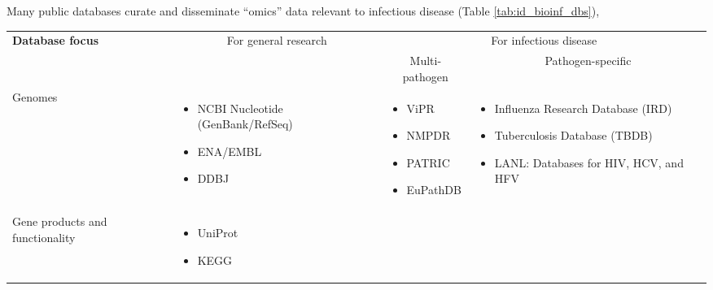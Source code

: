 Many public databases curate and disseminate “omics” data relevant to infectious disease (Table \ref{tab:id_bioinf_dbs}), 
\begin{table*}[ht]
  \centering
  \small
  \begin{tabular}{p{3.5cm} l l l}
    \toprule
    \textbf{Database focus} & \multicolumn{1}{c}{For general research} & \multicolumn{2}{c}{For infectious disease}\\
    \cline{3-4}
    & & \multicolumn{1}{c}{Multi-pathogen} & \multicolumn{1}{c}{Pathogen-specific} \\
    \midrule
    Genomes &
    \begin{minipage}[t]{3.5cm}
      \raggedright
      \begin{itemize}[noitemsep]
      \item NCBI Nucleotide (GenBank/RefSeq)
      \item ENA/EMBL
      \item DDBJ
      \end{itemize}
    \end{minipage} & 
    \begin{minipage}[t]{3.5cm}
      \raggedright
      \begin{itemize}[noitemsep]
      \item ViPR
      \item NMPDR
      \item PATRIC
      \item EuPathDB
      \end{itemize}
    \end{minipage} & 
    \begin{minipage}[t]{3.5cm}
      \raggedright
      \begin{itemize}[noitemsep]
      \item Influenza Research Database (IRD)
      \item Tuberculosis Database (TBDB)
      \item LANL: Databases for HIV, HCV, and HFV 
      \end{itemize}
    \end{minipage}
    \\
    Gene products and functionality &
    \begin{minipage}[t]{3.5cm}
      \raggedright
      \begin{itemize}[noitemsep]
      \item UniProt
      \item KEGG
      \end{itemize}
    \end{minipage} &

\end{tabular}
\end{table*}
